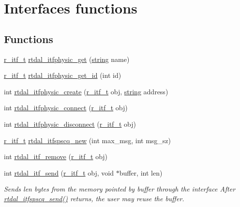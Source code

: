 \hypertarget{group__itf}{\section{Interfaces functions}
\label{group__itf}
}
\subsection*{Functions}
\begin{DoxyCompactItemize}
\item 
\hyperlink{rtdal__types_8h_a95fa1c8ca0f279eeb420f2083f6bee5d}{r\-\_\-itf\-\_\-t} \hyperlink{group__itf_ga8ce98b18d4dd61b0d5a93c18a53083a9}{rtdal\-\_\-itfphysic\-\_\-get} (\hyperlink{str_8h_a25093e36e9fb377b246945a84745823f}{string} name)
\item 
\hyperlink{rtdal__types_8h_a95fa1c8ca0f279eeb420f2083f6bee5d}{r\-\_\-itf\-\_\-t} \hyperlink{group__itf_ga99c8d3aaa646fd2933e3ff680c57f8db}{rtdal\-\_\-itfphysic\-\_\-get\-\_\-id} (int id)
\item 
int \hyperlink{group__itf_ga708955d3a3e316e1819cd0b0467cbca3}{rtdal\-\_\-itfphysic\-\_\-create} (\hyperlink{rtdal__types_8h_a95fa1c8ca0f279eeb420f2083f6bee5d}{r\-\_\-itf\-\_\-t} obj, \hyperlink{str_8h_a25093e36e9fb377b246945a84745823f}{string} address)
\item 
int \hyperlink{group__itf_ga5ad39e2199519b5790581d4a9cac7553}{rtdal\-\_\-itfphysic\-\_\-connect} (\hyperlink{rtdal__types_8h_a95fa1c8ca0f279eeb420f2083f6bee5d}{r\-\_\-itf\-\_\-t} obj)
\item 
int \hyperlink{group__itf_ga4a1bd7ea9743fe5213dcd18f0d9cbcbf}{rtdal\-\_\-itfphysic\-\_\-disconnect} (\hyperlink{rtdal__types_8h_a95fa1c8ca0f279eeb420f2083f6bee5d}{r\-\_\-itf\-\_\-t} obj)
\item 
\hyperlink{rtdal__types_8h_a95fa1c8ca0f279eeb420f2083f6bee5d}{r\-\_\-itf\-\_\-t} \hyperlink{group__itf_gae52e652cce22bfb7993040dc10c1c922}{rtdal\-\_\-itfspscq\-\_\-new} (int max\-\_\-msg, int msg\-\_\-sz)
\item 
int \hyperlink{group__itf_gafb140bf855934bd721b7c9c2eafa53c7}{rtdal\-\_\-itf\-\_\-remove} (\hyperlink{rtdal__types_8h_a95fa1c8ca0f279eeb420f2083f6bee5d}{r\-\_\-itf\-\_\-t} obj)
\item 
int \hyperlink{group__itf_ga2a6d148b7ab1e2de028d2ed9ff1eeced}{rtdal\-\_\-itf\-\_\-send} (\hyperlink{rtdal__types_8h_a95fa1c8ca0f279eeb420f2083f6bee5d}{r\-\_\-itf\-\_\-t} obj, void $\ast$buffer, int len)
\begin{DoxyCompactList}\small\item\em Sends len bytes from the memory pointed by buffer through the interface After \hyperlink{rtdal__itfspscq_8c_acf2650b9b3bdd719c7a058252a0c5a97}{rtdal\-\_\-itfspscq\-\_\-send()} returns, the user may reuse the buffer. \end{DoxyCompactList}\item 

\end{DoxyCompactItemize}
